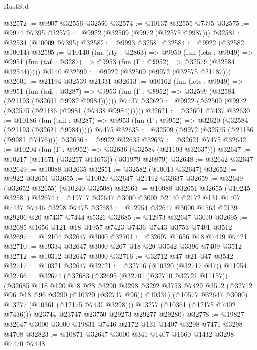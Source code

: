 \begin{lexlean}{RustStd}
\begin{coremodule}
@32572 := @9907 @32556 @32566
@32574 := @10137 @32555 @7395
@32575 := @9974 @7395
@32579 := @9922 (@32509 (@9972 (@32575 @9987)))
@32581 := @32534 (@10009 @7395)
@32582 := @9993 @32581
@32584 := @9922 (@32582 @10014)
@32595 := @10140
    (fun (rty : @2863) =>
    @9950
      (fun (lets : @9949) =>
      @9951 (fun (tail : @3287) => @9953 (fun (Γ : @9952) => @32579 (@32584 @32544)))))
    @3140
@32599 := @9922 (@32509 (@9972 (@32575 @21187)))
@32601 := @21194 @32539 @21331
@32613 := @10162
    (fun (lets : @9949) =>
    @9951
      (fun (tail : @3287) =>
      @9953 (fun (Γ : @9952) => @32599 (@32584 (@21193 (@32601 @9982 @9984))))))
    @7437
@32620 := @9922 (@32509 (@9972 (@32575 (@21186 (@9981 (@7438 @9984))))))
@32621 := @32601 @7437
@32630 := @10186
    (fun (tail : @3287) => @9953 (fun (Γ : @9952) => @32620 (@32584 (@21193 (@32621 @9984)))))
    @7475
@32635 := @32509 (@9972 (@32575 (@21186 (@9981 @7476))))
@32636 := @9922 @32635
@32637 := @32621 @7475
@32642 := @10204 (fun (Γ : @9952) => @32636 (@32584 (@21193 @32637)))
@32647 := @10217 (@11671 (@32257 @11673)) (@31979 @20879)
@32648 := @32642 @32647
@32649 := @10088 @32635
@32651 := @32582 (@10013 @32647)
@32652 := @9922 @32651
@32655 := @10020 @32647 @21192 @32637
@32659 := @32649 (@32652 @32655) (@10240 @32508)
@32663 := @10088 @32651 @32655 (@10245 @32581)
@32674 := @19717 @32647 @3000 @3000 @2140 @2172 @131 @1407 @7437 @7446 @3298 @7475
@32683 := @12954 @32647 @3000 @1663 @2139 @29206 @20 @7437 @7444 @5326
@32685 := @12973 @32647 @3000
@32695 := @32685 @1656 @121 @18 @1957 @7423 @7436 @7443 @3753 @7401 @3512
@32697 := @12104 @32647 @3000
@32701 := @32697 @1656 @18 @7419 @7421
@32710 := @19334 @32647 @3000 @267 @18 @20 @3542 @3396 @7409 @3512
@32712 := @10312 @32647 @3000
@32716 := @32712 @47 @21 @47 @3542
@32717 := @10321 @32647
@32721 := @32716 (@10320 (@32717 @47)) @11954
@32766 := @32674
    (@32683
      (@32695
        (@32701 (@32710 @32721 @11157))
        (@32685
          @118
          @120
          @18
          @28
          @3290
          @3298
          @3292
          @3753
          @7429
          @3512
          (@32712 @96 @18 @96 @3290 (@10320 (@32717 @96)) @10331)
          (@10577 @32647 @3000)
          @13277
          (@10361 (@12175 @7430 @3298)))
        @13277
        (@10361 (@12175 @7402 @7436)))
      @23744
      @23747
      @23750
      @29273
      @29277
      @29280)
@32778 := @19827 @32647 @3000 @3000 @19831 @7446 @2172 @131 @1407 @3298 @7471 @3298 @4708
@32823 := @10871
    @32647
    @3000
    @341
    @1407
    @1660
    @1432
    @3298
    @7470
    @7448

\end{coremodule}
\end{lexlean}
